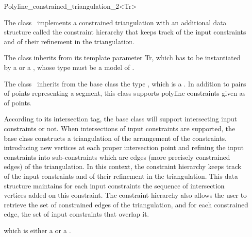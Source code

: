 
\begin{ccRefClass}{Polyline_constrained_triangulation_2<Tr>}


The class \ccRefName\ 
implements a constrained triangulation 
with an additional data
structure called the  constraint hierarchy 
that keeps track of  the input constraints and of their refinement
in the triangulation.

The class  inherits from
its template parameter Tr, which has to be instantiated by a
 or a
, whose
\ccStyle{Vertex} type must be a model of
.

The class \ccRefName\ inherits from the base class the type ,
which is a \ccc{std::pair<Point,Point>}. In addition to pairs
of points representing a segment, this class supports polyline constraints 
given as \ccc{Range} of points. 

According to its intersection tag, the base class
will support intersecting input constraints or not.
When intersections of input constraints are supported,
the base class constructs a triangulation  of the  arrangement
of the constraints,
introducing new vertices at each proper intersection
point and  refining the input constraints into sub-constraints
which are edges (more precisely constrained edges) of the
triangulation. 
In this context, the constraint hierarchy 
keeps track of  the input constraints and of their refinement
in the triangulation. This data structure 
maintains for each input constraints 
the sequence of intersection vertices added on this constraint.
The constraint hierarchy also allows the user to retrieve the set
of constrained edges of the triangulation, and for each
constrained edge,  the set of input constraints that overlap it.


\ccInheritsFrom
{} which is either a  or a .

\ccTypes 
{}



\end{ccRefClass}
